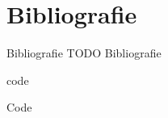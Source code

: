\documentclass[../presentatie.tex]{subfiles}
\begin{document}
\section{Bibliografie}

\clearrecentlist
    
\begin{frame}{Bibliografie}
    TODO Bibliografie
\end{frame}

\begin{saveblock}{code}
	\begin{highlightblock}[gobble=8,linewidth=0.5\textwidth,framexleftmargin=0.25em]
        Code         
	\end{highlightblock}
\end{saveblock}
\end{document}
